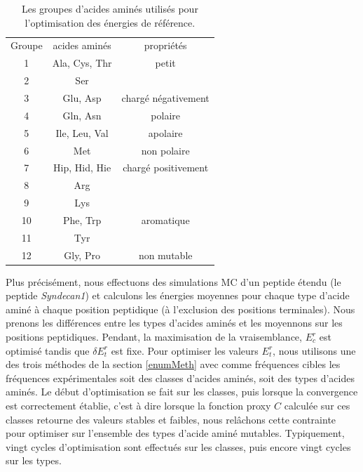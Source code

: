     \begin{table}[!htbp]
      \centering

      \begin{tabular}{ccc}

        \toprule
        Groupe & acides aminés & propriétés\\
        \cmidrule{1-3}

        1   & Ala, Cys, Thr & petit\\
        2   & Ser &\\
        \cmidrule{1-3}
        3   & Glu, Asp & chargé négativement\\
        \cmidrule{1-3}
        4   & Gln, Asn & polaire\\
        \cmidrule{1-3}
        5   & Ile, Leu, Val & apolaire\\
        \cmidrule{1-3}
        6   & Met & non polaire\\
        \cmidrule{1-3}
        7   & Hip, Hid, Hie & chargé positivement\\
        8   & Arg \\
        9   & Lys \\
        \cmidrule{1-3}
        10  & Phe, Trp & aromatique\\
        11  & Tyr \\
        \cmidrule{1-3}
        12  & Gly, Pro & non mutable\\
        \bottomrule


      \end{tabular}      
      \caption{Les groupes d'acides aminés utilisés pour l'optimisation des énergies de référence.}
\label{tab:AAgroups}      
    \end{table}

Plus précisément, nous effectuons des simulations MC d'un peptide étendu (le peptide \textit{Syndecan1}) et calculons les énergies moyennes pour chaque type d'acide aminé à chaque position peptidique (à l'exclusion des positions terminales). Nous prenons les différences entre les types d'acides aminés et les moyennons sur les positions peptidiques.
Pendant, la maximisation de la vraisemblance, $E_c^r$ est optimisé tandis que $\delta E_t^r$ est fixe. Pour optimiser les valeurs $E^r_t$, nous utilisons une des trois méthodes de la section \ref{enumMeth} avec comme fréquences cibles les fréquences expérimentales soit des classes d'acides aminés, soit des types d'acides aminés. Le  début d'optimisation se fait sur les classes, puis lorsque la convergence est correctement établie, c'est à dire lorsque la fonction proxy $C$ calculée sur ces classes retourne des valeurs stables et faibles, nous relâchons cette contrainte pour optimiser sur l'ensemble des types d'acide aminé mutables. Typiquement, vingt cycles d'optimisation sont effectués sur les classes, puis encore vingt cycles sur les types.  

